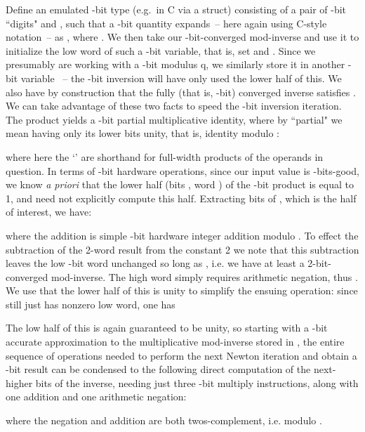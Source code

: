 \documentclass{article}
\begin{document}
Define an emulated -bit type (e.g.~in C via a struct) consisting of a pair of -bit ``digits"  and , such that a -bit quantity  expands~-- here again using C-style notation~-- as , where . We then take our -bit-converged mod-inverse  and use it to initialize the low word of such a -bit variable, that is, set  and . Since we presumably are working with a -bit modulus q, we similarly store it in another -bit variable ~-- the -bit inversion will have only used the lower half of this. We also have by construction that the fully (that is, -bit) converged inverse satisfies . We can take advantage of these two facts to speed the -bit inversion iteration. The product  yields a -bit partial multiplicative identity, where by ``partial" we mean having only its lower  bits unity, that is, identity modulo :

where here the `' are shorthand for full-width products of the operands in question. In terms of -bit hardware operations, since our input value  is -bits-good, we know {\em a priori} that the lower half (bits , word ) of the -bit product  is equal to 1, and need not explicitly compute this half. Extracting bits  of , which is the half of interest, we have:

where the addition is simple -bit hardware integer addition modulo . To effect the subtraction of the 2-word result  from the constant 2 we note that this subtraction leaves the low -bit word unchanged so long as , i.e. we have at least a 2-bit-converged mod-inverse. The high word simply requires arithmetic negation, thus . We use that the lower half of this is unity to simplify the ensuing  operation: since  still just has nonzero low word, one has

The low half of this is again guaranteed to be unity, so starting with a -bit accurate approximation to the multiplicative mod-inverse stored in , the entire sequence of operations needed to perform the next Newton iteration and obtain a -bit result can be condensed to the following direct computation of the next-higher  bits of the inverse, needing just three -bit multiply instructions, along with one addition and one arithmetic negation:

where the negation and addition are both twos-complement, i.e. modulo .
\end{document}
